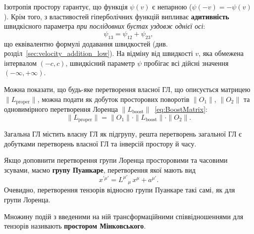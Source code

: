 Ізотропія простору гарантує, що функція $\psi(v)$ є непарною ($\psi(-v) = -\psi(v)$). Крім того, з властивостей
гіперболічних функцій випливає \textbf{адитивність} швидкісного параметра \emph{при послідовних бустах уздовж однієї
осі}:
\begin{equation*}
  \psi_{13} = \psi_{12} + \psi_{23},
\end{equation*}
що еквівалентно формулі додавання швидкостей (див. розділ~\ref{sec:velocity_addition_low}). На відміну від швидкості
$v$, яка обмежена інтервалом $(-c,c)$, швидкісний параметр $\psi$ пробігає всі дійсні значення $(-\infty,+\infty)$.


Можна показати, що будь-яке перетворення власної ГЛ, що описується матрицею $\| L_\text{proper}\|$, можна подати як
добуток просторових поворотів $\|{O}_1\|$, $\|{O}_2\|$ та одновимірного перетворення Лоренца
$\|{L}_\text{boost}\|$~\eqref{eq:BoostMatrix}:
\begin{equation*}
  \| L_\text{proper}\| = \|{O}_1\| \cdot \|{L}_\text{boost}\| \cdot \|{O}_2\|.
\end{equation*}

Загальна ГЛ містить власну ГЛ як підгрупу, решта перетворень загальної ГЛ є добутками перетворень власної ГЛ та інверсій
простору й часу.

Якщо доповнити перетворення групи Лоренца просторовими та часовими зсувами, маємо \textbf{групу Пуанкаре}, перетворення
якої мають вид
\begin{equation*}
  x^{\prime\mu'} = L^{\mu'}{}_\mu\, x^\mu + a^{\mu'}.
\end{equation*}
Очевидно, перетворення тензорів відносно групи Пуанкаре такі самі, як для групи Лоренца.

Множину подій з введеними на ній трансформаційними співвідношеннями для тензорів називають \textbf{простором
Мінковського}.

